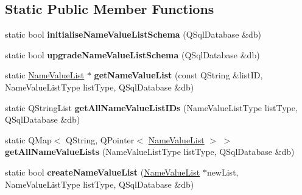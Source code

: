 \subsection*{Static Public Member Functions}
\begin{DoxyCompactItemize}
\item 
\mbox{\label{class_s_q_l_serialiser_name_value_list_af49c92af7146659732ca36760902bc36}} 
static bool {\bfseries initialise\+Name\+Value\+List\+Schema} (Q\+Sql\+Database \&db)
\item 
\mbox{\label{class_s_q_l_serialiser_name_value_list_a6c3ee987a9d0dbad4a5e4ded45212313}} 
static bool {\bfseries upgrade\+Name\+Value\+List\+Schema} (Q\+Sql\+Database \&db)
\item 
\mbox{\label{class_s_q_l_serialiser_name_value_list_a89477bc1c966edd619b27726c69a4bc8}} 
static \hyperlink{class_name_value_list}{Name\+Value\+List} $\ast$ {\bfseries get\+Name\+Value\+List} (const Q\+String \&list\+ID, Name\+Value\+List\+Type list\+Type, Q\+Sql\+Database \&db)
\item 
\mbox{\label{class_s_q_l_serialiser_name_value_list_a07a30a314bbad023679e25e1b4573a51}} 
static Q\+String\+List {\bfseries get\+All\+Name\+Value\+List\+I\+Ds} (Name\+Value\+List\+Type list\+Type, Q\+Sql\+Database \&db)
\item 
\mbox{\label{class_s_q_l_serialiser_name_value_list_abf16ff393123fb053300530133b4d4a4}} 
static Q\+Map$<$ Q\+String, Q\+Pointer$<$ \hyperlink{class_name_value_list}{Name\+Value\+List} $>$ $>$ {\bfseries get\+All\+Name\+Value\+Lists} (Name\+Value\+List\+Type list\+Type, Q\+Sql\+Database \&db)
\item 
\mbox{\label{class_s_q_l_serialiser_name_value_list_a736c88ebfd8fbefe9c9c08b9d65e575c}} 
static bool {\bfseries create\+Name\+Value\+List} (\hyperlink{class_name_value_list}{Name\+Value\+List} $\ast$new\+List, Name\+Value\+List\+Type list\+Type, Q\+Sql\+Database \&db)
\item 
\mbox{\label{class_s_q_l_serialiser_name_value_list_ab6cb69091e451a65d67862f37ee4da41}} 

\end{DoxyCompactItemize}
